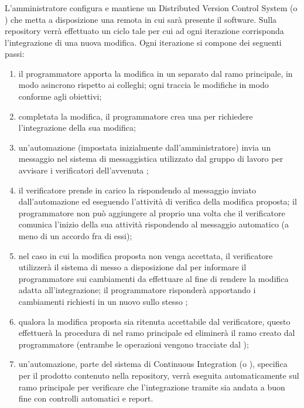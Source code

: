     \subsubsection{}
    L'amministratore configura e mantiene un Distributed Version Control System (o ) che metta a disposizione una  remota in cui sarà presente il software. Sulla repository verrà effettuato un ciclo tale per cui ad ogni iterazione corrisponda l'integrazione di una nuova modifica. Ogni iterazione si compone dei seguenti passi:
    \begin{enumerate}
    \item il programmatore apporta la modifica in un  separato dal ramo principale, in modo asincrono rispetto ai colleghi; ogni  traccia le modifiche in modo conforme agli obiettivi;
    \item completata la modifica, il programmatore crea una  per richiedere l'integrazione della sua modifica;
    \item un'automazione (impostata inizialmente dall'amministratore) invia un messaggio nel sistema di messaggistica utilizzato dal gruppo di lavoro per avvisare i verificatori dell'avvenuta ;
    \item il verificatore prende in carico la  rispondendo al messaggio inviato dall'automazione ed eseguendo l'attività di verifica della modifica proposta; il programmatore non può aggiungere  al proprio  una volta che il verificatore comunica l'inizio della sua attività rispondendo al messaggio automatico (a meno di un accordo fra di essi);
    \item nel caso in cui la modifica proposta non venga accettata, il verificatore utilizzerà il sistema di  messo a disposizione dal  per informare il programmatore sui cambiamenti da effettuare al fine di rendere la modifica adatta all'integrazione; il programmatore risponderà apportando i cambiamenti richiesti in un nuovo  sullo stesso ;
    \item qualora la modifica proposta sia ritenuta accettabile dal verificatore, questo effettuerà la procedura di  nel ramo principale ed eliminerà il ramo creato dal programmatore (entrambe le operazioni vengono tracciate dal );
    \item un'automazione, parte del sistema di Continuous Integration (o ), specifica per il prodotto contenuto nella repository, verrà eseguita automaticamente sul ramo principale per verificare che l'integrazione tramite  sia andata a buon fine con controlli automatici e report.
    \end{enumerate}

